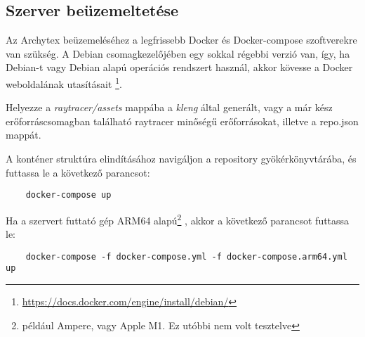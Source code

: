 \subsection{Szerver beüzemeltetése}\label{deploy}
Az Archytex beüzemeléséhez a legfrissebb Docker és Docker-compose szoftverekre van szükség. A Debian csomagkezelőjében egy sokkal régebbi verzió van, így, ha Debian-t vagy Debian alapú operációs rendszert használ, akkor kövesse a Docker weboldalának utasításait \footnote{\url{https://docs.docker.com/engine/install/debian/}}.

Helyezze a \emph{raytracer/assets} mappába a \emph{kleng} által generált, vagy a már kész erőforráscsomagban található raytracer minőségű erőforrásokat, illetve a repo.json mappát.

A konténer struktúra elindításához navigáljon a repository gyökérkönyvtárába, és futtassa le a következő parancsot:
\begin{lstlisting}
    docker-compose up
\end{lstlisting}

Ha a szervert futtató gép ARM64 alapú\footnote{például Ampere, vagy Apple M1. Ez utóbbi nem volt tesztelve} , akkor a következő parancsot futtassa le:
\begin{lstlisting}
    docker-compose -f docker-compose.yml -f docker-compose.arm64.yml up
\end{lstlisting}
